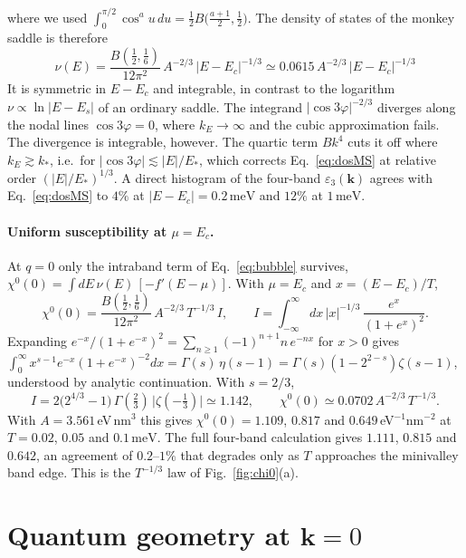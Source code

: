 \documentclass[11pt,a4paper]{article}
\numberwithin{equation}{section}
\newcommand{\bk}{\mathbf{k}}
\newcommand{\meV}{\,\mathrm{meV}}
\begin{document}
where we used $\int_0^{\pi/2}\cos^{a}u\,du=\tfrac12B\big(\tfrac{a+1}2,\tfrac12\big)$. The density of states of the monkey saddle is therefore
\begin{equation}
\boxed{\;\nu(E)=\frac{B(\tfrac12,\tfrac16)}{12\pi^2}\,A^{-2/3}\,|E-E_c|^{-1/3}\simeq0.0615\,A^{-2/3}\,|E-E_c|^{-1/3}\;}
\label{eq:dosMS}
\end{equation}
It is symmetric in $E-E_c$ and integrable, in contrast to the logarithm $\nu\propto\ln|E-E_s|$ of an ordinary saddle. The integrand $|\cos3\varphi|^{-2/3}$ diverges along the nodal lines $\cos3\varphi=0$, where $k_E\to\infty$ and the cubic approximation fails. The divergence is integrable, however. The quartic term $Bk^4$ cuts it off where $k_E\gtrsim k_*$, i.e.\ for $|\cos3\varphi|\lesssim|E|/E_*$, which corrects Eq.~\eqref{eq:dosMS} at relative order $(|E|/E_*)^{1/3}$. A direct histogram of the four-band $\varepsilon_3(\bk)$ agrees with Eq.~\eqref{eq:dosMS} to $4\%$ at $|E-E_c|=0.2\meV$ and $12\%$ at $1\meV$.

\paragraph{Uniform susceptibility at $\mu=E_c$.}
At $q=0$ only the intraband term of Eq.~\eqref{eq:bubble} survives, $\chi^0(0)=\int dE\,\nu(E)\,[-f'(E-\mu)]$. With $\mu=E_c$ and $x=(E-E_c)/T$,
\begin{equation}
\chi^0(0)=\frac{B(\tfrac12,\tfrac16)}{12\pi^2}\,A^{-2/3}\,T^{-1/3}\,I,\qquad
I=\int_{-\infty}^{\infty}\!dx\,|x|^{-1/3}\,\frac{e^x}{(1+e^x)^2}.
\end{equation}
Expanding $e^{-x}/(1+e^{-x})^2=\sum_{n\ge1}(-1)^{n+1}n\,e^{-nx}$ for $x>0$ gives $\int_0^\infty x^{s-1}e^{-x}(1+e^{-x})^{-2}dx=\Gamma(s)\,\eta(s-1)=\Gamma(s)(1-2^{2-s})\zeta(s-1)$, understood by analytic continuation. With $s=2/3$,
\begin{equation}
I=2\big(2^{4/3}-1\big)\,\Gamma(\tfrac23)\,\big|\zeta(-\tfrac13)\big|\simeq1.142,
\qquad
\chi^0(0)\simeq0.0702\,A^{-2/3}\,T^{-1/3}.
\end{equation}
With $A=3.561\,$eV\,nm$^3$ this gives $\chi^0(0)=1.109$, $0.817$ and $0.649\,$eV$^{-1}$nm$^{-2}$ at $T=0.02$, $0.05$ and $0.1\meV$. The full four-band calculation gives $1.111$, $0.815$ and $0.642$, an agreement of $0.2$--$1\%$ that degrades only as $T$ approaches the minivalley band edge. This is the $T^{-1/3}$ law of Fig.~\ref{fig:chi0}(a).

\section{Quantum geometry at $\bk=0$}\label{app:geometry}
\end{document}
